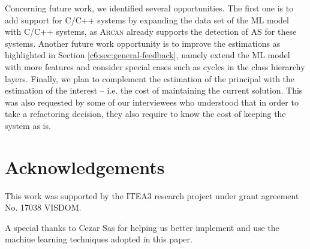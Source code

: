 Concerning future work, we identified several opportunities. The first one is to add support for C/C++ systems by expanding the data set of the ML model with C/C++ systems, as \textsc{Arcan} already supports the detection of AS for these systems.
Another future work opportunity is to improve the estimations as highlighted in Section \ref{c6:sec:general-feedback}, namely extend the ML model with more features and consider special cases such as cycles in the class hierarchy layers.
Finally, we plan to complement the estimation of the principal with the estimation of the interest -- i.e. the cost of maintaining the current solution.
This was also requested by some of our interviewees who understood that in order to take a refactoring decision, they also require to know the cost of keeping the system as is.


\section*{Acknowledgements}
This work was supported by the ITEA3 research project under grant agreement No. 17038 VISDOM.

A special thanks to Cezar Sas for helping us better implement and use the machine learning techniques adopted in this paper.
